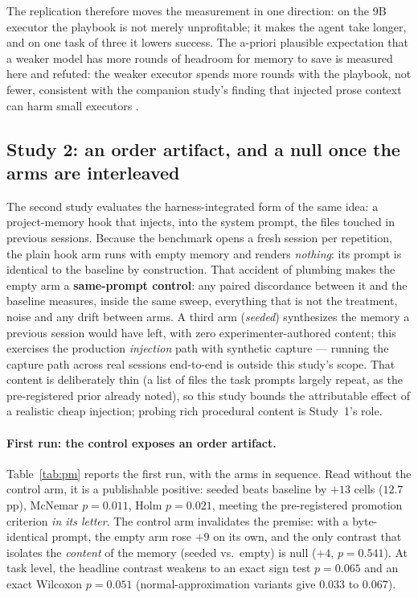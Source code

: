 \documentclass[smallcondensed,natbib]{svjour3}
\begin{document}
The replication therefore moves the measurement in one direction: on
the 9B executor the playbook is not merely unprofitable; it makes the
agent take longer, and on one task of three it lowers success. The a-priori plausible
expectation that a weaker model has more rounds of headroom for memory
to save is measured here and refuted: the weaker executor spends more
rounds with the playbook, not fewer, consistent with the companion
study's finding that injected prose context can harm small executors
\citep{parra2026scaffolding}.

\subsection{Study 2: an order artifact, and a null once the arms are
interleaved}\label{sec:results-pm}

The second study evaluates the harness-integrated form of the same
idea: a project-memory hook that injects, into the system prompt, the
files touched in previous sessions. Because the benchmark opens a
fresh session per repetition, the plain hook arm runs with empty
memory and renders \emph{nothing}: its prompt is identical to the
baseline by construction. That accident of plumbing makes the empty
arm a \textbf{same-prompt control}: any paired discordance between it
and the baseline measures, inside the same sweep, everything that is
not the treatment, noise and any drift between arms. A third arm
(\emph{seeded}) synthesizes the memory a previous session would have
left, with zero experimenter-authored content; this exercises the
production \emph{injection} path with synthetic capture --- running
the capture path across real sessions end-to-end is outside this
study's scope. That content is deliberately thin (a list of files the
task prompts largely repeat, as the pre-registered prior already
noted), so this study bounds the attributable effect of a realistic
cheap injection; probing rich procedural content is Study~1's role.

\paragraph{First run: the control exposes an order artifact.}
Table~\ref{tab:pm} reports the first run, with the arms in sequence.
Read without the control arm, it is a publishable positive: seeded
beats baseline by $+13$ cells ($12.7$\,pp), McNemar $p=0.011$, Holm
$p=0.021$, meeting the pre-registered promotion criterion \emph{in its
letter}. The control arm invalidates the premise: with a byte-identical
prompt, the empty arm rose $+9$ on its own, and the only contrast that
isolates the \emph{content} of the memory (seeded vs.\ empty) is null
($+4$, $p=0.541$). At task level, the headline contrast weakens to an
exact sign test $p=0.065$ and an exact Wilcoxon $p=0.051$
(normal-approximation variants give $0.033$ to $0.067$).
\end{document}
